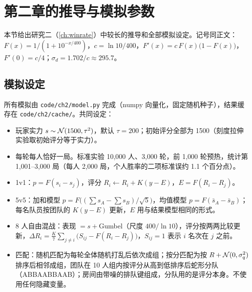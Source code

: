 \section{第二章的推导与模拟参数}
\label{app:ch2}

本节给出研究二（\cref{ch:winrate}）中较长的推导和全部模拟设定。记号同正文：$F(x)=1/(1+10^{-x/400})$，$c=\ln10/400$，$F'(x)=c\,F(x)\bigl(1-F(x)\bigr)$，$F'(0)=c/4$；$\sigma_d=1.702/c\approx295.7$。

\subsection{模拟设定}
\label{app:ch2-params}

所有模拟由 \texttt{code/ch2/model.py} 完成（numpy 向量化，固定随机种子），结果缓存在 \texttt{code/ch2/cache/}。共同设定：
\begin{itemize}
\item 玩家实力 $s\sim\mathcal{N}(1500,\tau^2)$，默认 $\tau=200$；初始评分全部为 1500（刻度拉伸实验取初始评分等于实力）。
\item 每轮每人恰好一局。标准实验 10,000 人、3,000 轮，前 1,000 轮预热，统计第 1,001–3,000 局（每人 2,000 局，个人胜率的二项标准误约 1.1 个百分点）。
\item 1v1：$p=F(s_i-s_j)$，评分 $R_i\leftarrow R_i+K(y-E)$，$E=F(R_i-R_j)$。
\item 5v5：加和模型 $p=F\bigl((\sum s_A-\sum s_B)/\sqrt5\bigr)$，均值模型 $p=F(\bar s_A-\bar s_B)$；每名队员按团队的 $K(y-E)$ 更新，$E$ 用与结果模型相同的形式。
\item 8 人自由混战：表现 $=s+$Gumbel（尺度 $400/\ln10$），评分按两两比较更新，$\Delta R_i=\frac{K}{7}\sum_{j\ne i}\bigl(S_{ij}-F(R_i-R_j)\bigr)$，$S_{ij}=1$ 表示 $i$ 名次在 $j$ 之前。
\item 匹配：随机匹配为每轮全体随机打乱后依次成组；按分匹配为按 $R+\mathcal{N}(0,\sigma_q^2)$ 排序后相邻成组，团队在 10 人组内按评分从高到低排序后蛇形分队（ABBAABBAAB）；房间由带噪的排队键组成，分队用的是评分本身。不使用任何隐藏变量。
\end{itemize}

